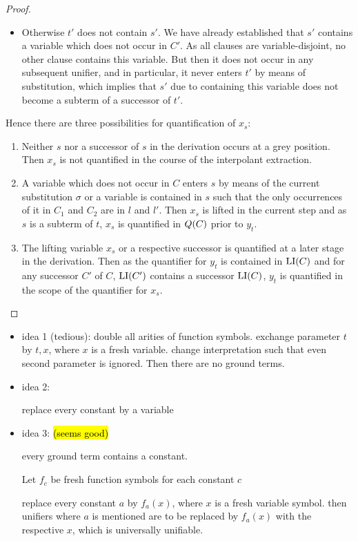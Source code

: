 \documentclass[,%
	draft=false,%
	numbers=noendperiod
	11pt,
	a4paper,
	oneside,%
	openany,
]{memoir}
\begin{document}
\begin{proof}
\begin{itemize}
		\item Otherwise $t'$ does not contain $s'$.
			We have already established that $s'$ contains a variable which does not occur in $C'$.
			As all clauses are variable-disjoint, no other clause contains this variable.
			But then it does not occur in any subsequent unifier, and in particular, it never enters $t'$ by means of substitution, which implies that $s'$ due to containing this variable does not become a subterm of a successor of $t'$.

	\end{itemize}

	Hence there are three possibilities for quantification of $x_s$:
	\begin{enumerate}
		\item Neither $s$ nor a successor of $s$ in the derivation occurs at a grey position. Then $x_s$ is not quantified in the course of the interpolant extraction.
		\item A variable which does not occur in $C$ enters $s$ by means of the current substitution $\sigma$ or a variable is contained in $s$ such that the only occurrences of it in $C_1$ and $C_2$ are in $l$ and $l'$.
			Then $x_s$ is lifted in the current step and as $s$ is a subterm of $t$, $x_s$ is quantified in $Q(C)$ prior to $y_t$.
		\item The lifting variable $x_s$ or a respective successor is quantified at a later stage in the derivation.
			Then as the quantifier for $y_t$ is contained in $\operatorname{LI}(C)$ and for any successor $C'$ of $C$, $\operatorname{LI}(C')$ contains a successor $\operatorname{LI}(C)$, $y_t$ is quantified in the scope of the quantifier for $x_s$.
			\qedhere
	\end{enumerate}
\end{proof}



\begin{itemize}
	\item idea 1 (tedious):
		double all arities of function symbols.
		exchange parameter $t$ by $t, x$, where $x$ is a fresh variable.
		change interpretation such that even second parameter is ignored.
		Then there are no ground terms.

	\item idea 2:

		replace every constant by a variable

	\item idea 3: \hl{(seems good)}

		every ground term contains a constant.

		Let $f_c$ be fresh function symbols for each constant $c$

		replace every constant $a$ by $f_a(x)$, where $x$ is a fresh variable symbol.
		then unifiers where $a$ is mentioned are to be replaced by $f_a(x)$ with the respective $x$, which is universally unifiable.
\end{itemize}
\end{document}
